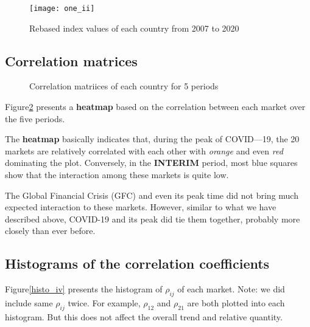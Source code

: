 \documentclass[
]{article}
\begin{document}
\begin{figure}[!htb]
\centering
\texttt{[image: one\_ii]}
\caption{Rebased index values of each country from 2007 to 2020}\label{one_ii}
\end{figure}

\hypertarget{correlation-matrices}{%
\subsection{Correlation matrices}\label{correlation-matrices}}

\begin{figure}
\centering
{}\hspace{5pt}
\hspace{5pt}
\caption{Correlation matriices of each country for 5 periods} \label{corr_iii}
\end{figure}

Figure\ref{corr_iii} presents a \textbf{heatmap} based on the
correlation between each market over the five periods.

The \textbf{heatmap} basically indicates that, during the peak of
COVID---19, the 20 markets are relatively correlated with each other
with \emph{orange} and even \emph{red} dominating the plot. Conversely,
in the \textbf{INTERIM} period, most blue squares show that the
interaction among these markets is quite low.

The Global Financial Crisis (GFC) and even its peak time did not bring
much expected interaction to these markets. However, similar to what we
have described above, COVID-19 and its peak did tie them together,
probably more closely than ever before.

\hypertarget{histograms-of-the-correlation-coefficients}{%
\subsection{Histograms of the correlation
coefficients}\label{histograms-of-the-correlation-coefficients}}

Figure\ref{histo_iv} presents the histogram of \(\rho_{ij}\) of each
market. Note: we did include same \(\rho_{ij}\) twice. For example,
\(\rho_{12}\) and \(\rho_{21}\) are both plotted into each histogram.
But this does not affect the overall trend and relative quantity.
\end{document}
